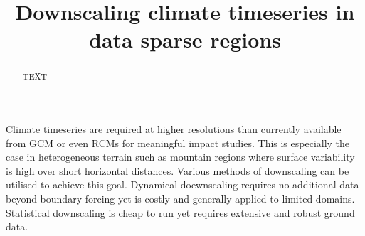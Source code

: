 \documentclass[hess, manuscript]{copernicus}
\begin{document}
\title{Downscaling climate timeseries in data sparse regions}



\Author[]{}{}
\Author[]{}{}
\Author[]{}{}













\received{}
\pubdiscuss{} %
\revised{}
\accepted{}
\published{}




\maketitle



\begin{abstract}
TEXT
\end{abstract}




\introduction  %
Climate timeseries are required at higher resolutions than currently available from GCM or even RCMs for meaningful impact studies. This is especially the case in heterogeneous terrain such as mountain regions where surface variability is high over short horizontal distances. Various methods of downscaling can be utilised to achieve this goal. Dynamical doewnscaling requires no additional data beyond boundary forcing yet is costly and generally applied to limited domains. Statistical downscaling is cheap to run yet requires extensive and robust ground data.
\end{document}
